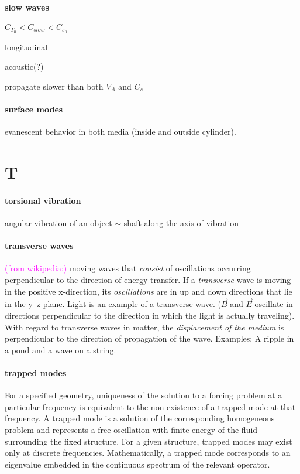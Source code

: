\documentclass[12pt]{article}
\begin{document}
\paragraph{slow waves}
\begin{itemize*}
    \item $C_{T_0} < C_{slow} < C_{s_0}$
    \item longitudinal
    \item acoustic(?)
    \item propagate slower than both $V_A$ and $C_s$
\end{itemize*}

\paragraph{surface modes}
evanescent behavior in both media (inside and outside cylinder).


\section*{T}

\paragraph{torsional vibration}
\begin{itemize*}
    \item angular vibration of an object $\sim$ shaft along the
        axis of vibration
\end{itemize*}

\paragraph{transverse waves}
\textcolor{magenta}{(from wikipedia:)}
moving waves that \emph{consist} of oscillations occurring perpendicular
to the direction of energy transfer.
If a \emph{transverse} wave is moving in the positive x-direction,
its \emph{oscillations} are in up and down directions that lie in the y–z plane.
Light is an example of a transverse wave.
($\vec B$ and $\vec E$ oscillate in directions perpendicular to the direction
in which the light is actually traveling).
With regard to transverse waves in matter,
the \emph{displacement of the medium} is perpendicular to the
direction of propagation of the wave.
Examples: A ripple in a pond and a wave on a string.

\paragraph{trapped modes}
For a specified geometry, uniqueness of the solution to a forcing problem
at a particular frequency is equivalent to the non-existence of a trapped
mode at that frequency. A trapped mode is a solution of the corresponding
homogeneous problem and represents a free oscillation with finite energy
of the fluid surrounding the fixed structure. For a given structure,
trapped modes may exist only at discrete frequencies.
Mathematically, a trapped mode corresponds to an eigenvalue embedded
in the continuous spectrum of the relevant operator.
\end{document}
